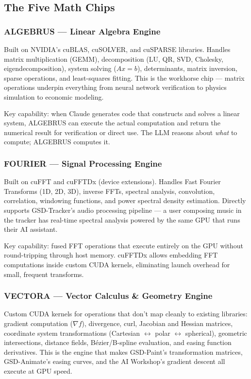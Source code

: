 \documentclass[11pt,letterpaper]{article}
\begin{document}
\subsection{The Five Math Chips}

\subsubsection{ALGEBRUS --- Linear Algebra Engine}

Built on NVIDIA's cuBLAS, cuSOLVER, and cuSPARSE libraries. Handles matrix multiplication (GEMM), decomposition (LU, QR, SVD, Cholesky, eigendecomposition), system solving ($Ax = b$), determinants, matrix inversion, sparse operations, and least-squares fitting. This is the workhorse chip --- matrix operations underpin everything from neural network verification to physics simulation to economic modeling.

Key capability: when Claude generates code that constructs and solves a linear system, ALGEBRUS can execute the actual computation and return the numerical result for verification or direct use. The LLM reasons about \textit{what} to compute; ALGEBRUS computes it.

\subsubsection{FOURIER --- Signal Processing Engine}

Built on cuFFT and cuFFTDx (device extensions). Handles Fast Fourier Transforms (1D, 2D, 3D), inverse FFTs, spectral analysis, convolution, correlation, windowing functions, and power spectral density estimation. Directly supports GSD-Tracker's audio processing pipeline --- a user composing music in the tracker has real-time spectral analysis powered by the same GPU that runs their AI assistant.

Key capability: fused FFT operations that execute entirely on the GPU without round-tripping through host memory. cuFFTDx allows embedding FFT computations inside custom CUDA kernels, eliminating launch overhead for small, frequent transforms.

\subsubsection{VECTORA --- Vector Calculus \& Geometry Engine}

Custom CUDA kernels for operations that don't map cleanly to existing libraries: gradient computation ($\nabla f$), divergence, curl, Jacobian and Hessian matrices, coordinate system transformations (Cartesian $\leftrightarrow$ polar $\leftrightarrow$ spherical), geometric intersections, distance fields, Bézier/B-spline evaluation, and easing function derivatives. This is the engine that makes GSD-Paint's transformation matrices, GSD-Animate's easing curves, and the AI Workshop's gradient descent all execute at GPU speed.
\end{document}
